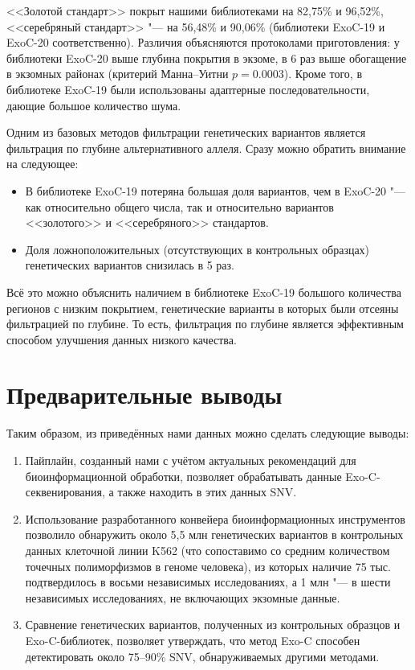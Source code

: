 \documentclass[a4paper,14pt]{extarticle}
\begin{document}
<<Золотой стандарт>> покрыт нашими библиотеками на 82,75\% и 96,52\%, <<серебряный стандарт>> "--- на 56,48\% и 90,06\% (библиотеки ExoC-19 и ExoC-20 соответственно).
Различия объясняются протоколами приготовления: у библиотеки ExoC-20 выше глубина покрытия в экзоме, в 6 раз выше обогащение в экзомных районах (критерий Манна--Уитни $p = 0.0003$).
Кроме того, в библиотеке ExoC-19 были использованы адаптерные последовательности, дающие большое количество шума.

Одним из базовых методов фильтрации генетических вариантов является фильтрация по глубине альтернативного аллеля.
Сразу можно обратить внимание на следующее:

\begin{itemize}
\item В библиотеке ExoC-19 потеряна большая доля вариантов, чем в ExoC-20 "--- как относительно общего числа, так и относительно вариантов <<золотого>> и <<серебряного>> стандартов.
\item Доля ложноположительных (отсутствующих в контрольных образцах) генетических вариантов снизилась в 5 раз.
\end{itemize}

Всё это можно объяснить наличием в библиотеке ExoC-19 большого количества регионов с низким покрытием, генетические варианты в которых были отсеяны фильтрацией по глубине.
То есть, фильтрация по глубине является эффективным способом улучшения данных низкого качества.

\section{Предварительные выводы}

Таким образом, из приведённых нами данных можно сделать следующие выводы:

\begin{enumerate}
\item Пайплайн, созданный нами с учётом актуальных рекомендаций для биоинформационной обработки, позволяет обрабатывать данные Exo-C\hyp{}секвенирования, а также находить в этих данных SNV.
\item Использование разработанного конвейера биоинформационных инструментов позволило обнаружить около 5,5 млн генетических вариантов в контрольных данных клеточной линии K562 (что сопоставимо со средним количеством точечных полиморфизмов в геноме человека), из которых наличие 75 тыс. подтвердилось в восьми независимых исследованиях, а 1 млн "--- в шести независимых исследованиях, не включающих экзомные данные.
\item Сравнение генетических вариантов, полученных из контрольных образцов и Exo-C\hyp{}библиотек, позволяет утверждать, что метод Exo-C способен детектировать около 75--90\% SNV, обнаруживаемых другими методами.
\end{enumerate}
\end{document}
